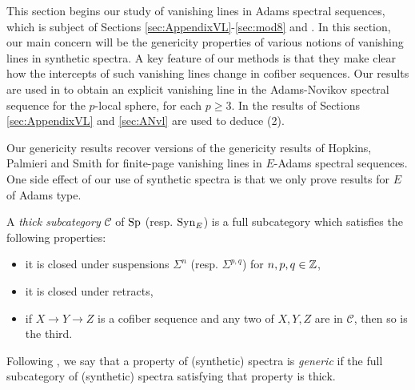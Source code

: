 %
This section begins our study of vanishing lines in Adams spectral sequences, which is subject of Sections \ref{sec:AppendixVL}-\ref{sec:mod8} and . In this section, our main concern will be the genericity properties of various notions of vanishing lines in synthetic spectra. A key feature of our methods is that they make clear how the intercepts of such vanishing lines change in cofiber sequences. Our results are used in  to obtain an explicit vanishing line in the Adams-Novikov spectral sequence for the $p$-local sphere, for each $p \ge 3$. In  the results of Sections \ref{sec:AppendixVL} and \ref{sec:ANvl} are used to deduce (2).

Our genericity results recover versions of the genericity results of Hopkins, Palmieri and Smith \cite{HPS} for finite-page vanishing lines in $E$-Adams spectral sequences.  One side effect of our use of synthetic spectra is that we only prove results for $E$ of Adams type.





\begin{dfn}
  A \emph{thick subcategory} $\mathcal{C}$ of $\operatorname{\mathrm{Sp}}$ (resp. $\mathrm{Syn}_E$) is a full subcategory which satisfies the following properties:
  \begin{itemize}
  \item it is closed under suspensions $\Sigma^n$ (resp. $\Sigma^{p,q}$) for $n,p,q \in \mathbb{Z}$,
  \item it is closed under retracts,
  \item if $X \to Y \to Z$ is a cofiber sequence and any two of $X,Y,Z$ are in $\mathcal{C}$, then so is the third.
  \end{itemize}

  Following \cite[Definition 1.1]{HPS}, we say that a property of (synthetic) spectra is \emph{generic} if the full subcategory of (synthetic) spectra satisfying that property is thick.
\end{dfn}

